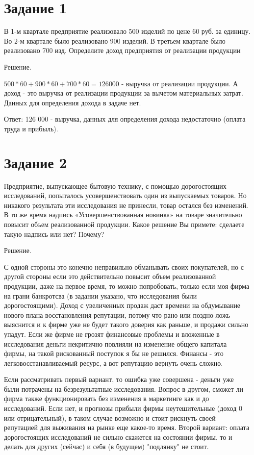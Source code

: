 \documentclass[14pt,a4paper]{extarticle}
\begin{document}
\section{Задание 1}
\begin{sloppypar}
В 1-м квартале предприятие реализовало 500 изделий по цене 60 руб. за единицу. Во
2-м квартале было реализовано 900 изделий. В третьем квартале было реализовано 700 изд.
Определите доход предприятия от реализации продукции
\end{sloppypar}

Решение.

    $500 * 60 + 900 * 60 + 700 * 60 = 126 000$ - выручка от реализации продукции.
    А доход - это выручка от реализации продукции за вычетом материальных затрат. Данных
    для определения дохода в задаче нет.

    Ответ: 126 000 - выручка, данных для определения дохода недостаточно (оплата труда и прибыль).

\section{Задание 2}
Предприятие, выпускающее бытовую технику, с помощью дорогостоящих
исследований, попыталось усовершенствовать один из выпускаемых товаров. Но никакого
результата эти исследования не принесли, товар остался без изменений. В то же время
надпись «Усовершенствованная новинка» на товаре значительно повысит объем
реализованной продукции.
Какое решение Вы примете: сделаете такую надпись или нет? Почему?

Решение.

С одной стороны это конечно неправильно обманывать своих покупателей, но с другой стороны
если это действительно повысит объем реализованной продукции, даже на первое время, то можно
    попробовать, только если моя фирма на грани банкротсва (в задании указано, что исследования были дорогостоящими).
    Доход с увеличенных продаж даст времени на обдумывание нового плана восстановления репутации, потому что рано
    или поздно ложь выяснится и к фирме уже не будет такого доверия как раньше, и продажи сильно упадут.
    Если же фирме не грозят финансовые проблемы и вложенные в исследования деньги некритично повлияли на изменение
    общего капитала фирмы, на такой рискованный поступок я бы не решился.
    Финансы - это легковосстанавливаемый ресурс, а вот репутацию вернуть очень сложно.

    Если рассматривать первый вариант, то ошибка уже совершена - деньги уже были потрачены на безрезультатные
    исследования. Вопрос в другом, сможет ли фирма также функционировать без изменения в маркетинге как и до
    исследований. Если нет, и прогнозы прибыли фирмы неутешительные (доход 0 или отрицательный), в таком
    случае возможно и стоит рискнуть своей репутацией для выживания на рынке еще какое-то время.
    Второй вариант: оплата дорогостоящих исследований не сильно скажется на состоянии фирмы, то и
    делать для других (сейчас) и себя (в будущем) "подлянку" не стоит.
\end{document}
